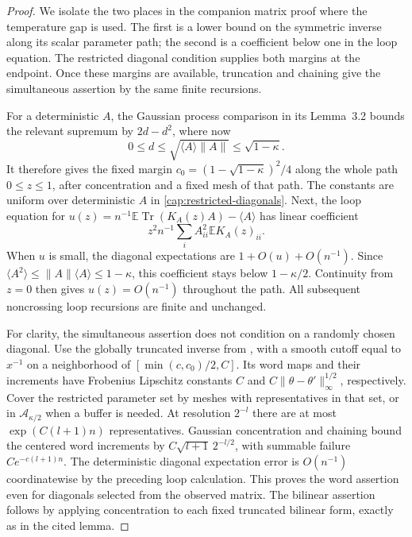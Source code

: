 \begin{proof}
We isolate the two places in the companion matrix proof
\cite[Section~3]{AcceptedGap} where the
temperature gap is used. The first is a lower bound on the symmetric
inverse along its scalar parameter path; the second is a coefficient below
one in the loop equation. The restricted diagonal condition supplies both
margins at the endpoint. Once these margins are available, truncation and
chaining give the simultaneous assertion by the same finite recursions.


For a deterministic $A$, the Gaussian process comparison in its
Lemma~3.2 bounds the relevant supremum by $2d-d^2$, where now
\[
 0\le d\le \sqrt{\langle A\rangle\|A\|}
             \le\sqrt{1-\kappa}.
\]
It therefore gives the fixed margin $c_0=(1-\sqrt{1-\kappa})^2/4$ along the
whole path $0\le z\le1$, after concentration and a fixed mesh of that path.
The constants are uniform over deterministic $A$ in
\eqref{cap:restricted-diagonals}. Next, the loop equation for
$u(z)=n^{-1}\mathbb E\operatorname{Tr}(K_A(z)A)-\langle A\rangle$ has linear
coefficient
\[
 z^2 n^{-1}\sum_i A_{ii}^2\mathbb E K_A(z)_{ii}.
\]
When $u$ is small, the diagonal expectations are $1+O(u)+O(n^{-1})$. Since
$\langle A^2\rangle\le\|A\|\langle A\rangle\le1-\kappa$, this coefficient
stays below $1-\kappa/2$. Continuity from $z=0$ then gives $u(z)=O(n^{-1})$
throughout the path. All subsequent noncrossing loop recursions are finite and
unchanged.

For clarity, the simultaneous assertion does not condition on a randomly
chosen diagonal. Use the globally truncated inverse from
\cite[Section~3.2]{AcceptedGap}, with a smooth cutoff equal to $x^{-1}$ on a
neighborhood of $[\min(c,c_0)/2,C]$. Its word maps and their increments have
Frobenius Lipschitz constants $C$ and $C\|\theta-\theta'\|_\infty^{1/2}$,
respectively. Cover the restricted parameter set by meshes with
representatives in that set, or in $\mathcal A_{\kappa/2}$ when a buffer is
needed. At resolution $2^{-l}$ there are at most $\exp(C(l+1)n)$
representatives. Gaussian concentration and chaining bound the centered word
increments by $C\sqrt{l+1}\,2^{-l/2}$, with summable failure $Ce^{-c(l+1)n}$.
The deterministic diagonal expectation error is $O(n^{-1})$ coordinatewise by
the preceding loop calculation. This proves the word assertion even for
diagonals selected from the observed matrix. The bilinear assertion follows by
applying concentration to each fixed truncated bilinear form, exactly as in
the cited lemma.


\end{proof}

